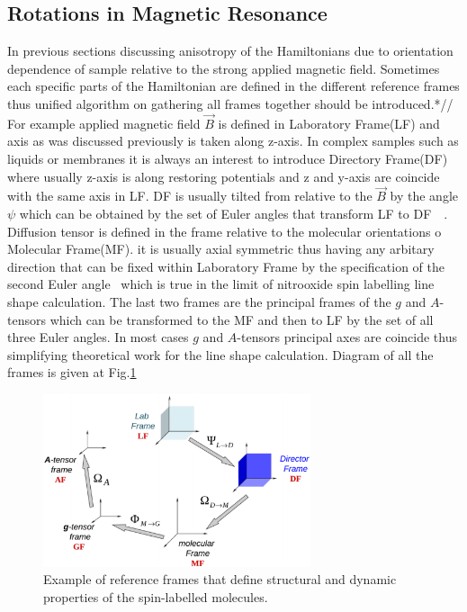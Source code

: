 \subsection{Rotations in Magnetic Resonance}\label{torationsection}
In previous sections discussing anisotropy of the Hamiltonians due to orientation dependence of sample relative to the strong applied magnetic field. Sometimes each specific parts of the Hamiltonian are defined in the different reference frames thus unified algorithm on gathering all frames together should be introduced.*//  
For example applied magnetic field $\vec{B}$ is defined in Laboratory Frame(LF) and axis as was discussed previously is taken along z-axis. In complex samples such as liquids or membranes it is always an interest to introduce Directory Frame(DF) where usually z-axis is along restoring potentials and z and y-axis are coincide with the same axis in LF. DF is usually tilted from relative to the $\vec{B}$ by the angle $\psi$ which can be obtained by the set of Euler angles that transform LF to DF~\cite{rotat}~\cite{bmr}. Diffusion tensor is defined in the frame relative to the molecular orientations o Molecular Frame(MF). it is usually axial symmetric thus having any arbitary direction that can be fixed within Laboratory Frame by the specification of the second Euler angle~\cite{bmr} which is true in the limit of nitrooxide spin labelling line shape calculation. The last two frames are the principal frames of the $g$ and $A$-tensors which can be transformed to the MF and then to LF by the set of all three Euler angles. In most cases $g$ and $A$-tensors principal axes are coincide thus simplifying theoretical work for the line shape calculation. Diagram of all the frames is given at Fig.\ref{figure:rotat}
\begin{figure}[h]
\centering
\includegraphics[width=0.7\textwidth]{figures/chap1/frames.eps}
\caption{Example of reference frames that define structural and dynamic properties of the spin-labelled molecules.~\cite{rotat}}
\label{figure:rotat}
\end{figure}
